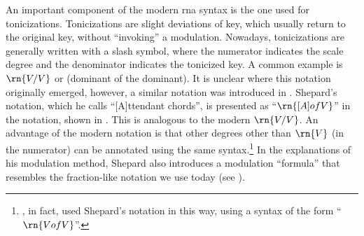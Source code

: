 




An important component of the modern \gls{rna} syntax is the
one used for tonicizations. Tonicizations are slight
deviations of key, which usually return to the original key,
without ``invoking'' a modulation. Nowadays, tonicizations
are generally written with a slash symbol, where the
numerator indicates the scale degree and the denominator
indicates the tonicized key. A common example is $\rn{V/V}$
or (dominant of the dominant). It is unclear where this
notation originally emerged, however, a similar notation was
introduced in \textcite{shepard1889how}. Shepard's notation,
which he calls ``[A]ttendant chords'', is presented as
``$\rn{[A] of V}$'' in the notation, shown in
. This is
analogous to the modern $\rn{V/V}$. An advantage of the
modern notation is that other degrees other than $\rn{V}$
(in the numerator) can be annotated using the same
syntax.\footnote{\textcite{piston1941harmony}, in fact, used
Shepard's notation in this way, using a syntax of the form
``$\rn{V of V}$''.} In the explanations of his modulation
method, Shepard also introduces a modulation ``formula''
that resembles the fraction-like notation we use today (see
). 





